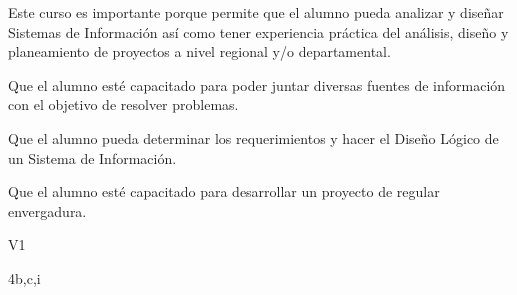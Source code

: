 \begin{syllabus}


\begin{justification}
	Este curso es importante porque permite que el alumno pueda analizar y diseñar Sistemas de Información así­ como tener experiencia práctica del análisis, diseño y planeamiento de proyectos a nivel regional y/o departamental.
	\end{justification}
	
	\begin{goals}
	\item Que el alumno esté capacitado para poder juntar diversas fuentes de información con el objetivo de resolver problemas.
	\item Que el alumno pueda determinar los requerimientos y hacer el Diseño Lógico de un Sistema de Información.
	\item Que el alumno esté capacitado para desarrollar un proyecto de regular envergadura.
	\end{goals}
	
	\begin{outcomes}{V1}
		\item {}
		\item {}
		\item {}
		\item {}
		\item {}
		\item {}
		\item {}
	\end{outcomes}
	
	\begin{unit}{\LUSEVENDef}{}{\LUSEVENBib}{4}{b,c,i}
	\begin{topics}
		  \item \OMCONEOHTopicTWOxONEOHxONE
		  \item \TDSSIXTopicTHREExSIXxONE
		  \item \TDSSIXTopicTHREExSIXxTWO
		  \item \TDSEIGHTTopicTHREExEIGHTxONE
	\end{topics}
		  \LUSEVENGoal
	\end{unit}
	

\end{syllabus}
